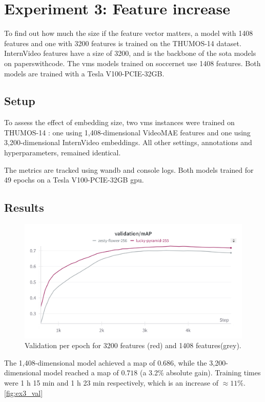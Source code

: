 \section{Experiment 3: Feature increase}
\label{sec:experiment3}
To find out how much the size if the feature vector matters, a model with 1408 features and one with 3200 features is trained on the THUMOS-14 dataset.
InternVideo features have a size of 3200, and is the backbone of the \acrshort{sota} models on paperswithcode. The \acrshort{vms} models trained on soccernet use 1408 features. Both models are trained with a Tesla V100-PCIE-32GB.


\subsection{Setup}
\label{ssec:ex3_setup}

To assess the effect of embedding size, two \acrshort{vms} instances were trained on THUMOS-14 \cite{dataset:thumos}: one using 1,408-dimensional VideoMAE features and one using 3,200-dimensional InternVideo embeddings. All other settings, annotations and hyperparameters, remained identical.

The metrics are tracked using \acrlong{wandb} and console logs.
Both models trained for 49 epochs on a Tesla V100-PCIE-32GB \acrshort{gpu}.

\subsection{Results}
\label{ssec:ex3_results}

\begin{figure}
    \centering
    \includegraphics[width=0.5\linewidth]{figures/1408_3200_val.png}
    \caption{Validation per epoch for 3200 features (red) and 1408 features(grey). }
    \label{fig:ex3_val}
\end{figure}
The 1,408-dimensional model achieved a  \acrshort{map} of \(0.686\), while the 3,200-dimensional model reached a \acrshort{map} of \(0.718\) (a 3.2\% absolute gain). Training times were 1 h 15 min and 1 h 23 min respectively, which is an increase of \(\approx11\%\). \autoref{fig:ex3_val} 

